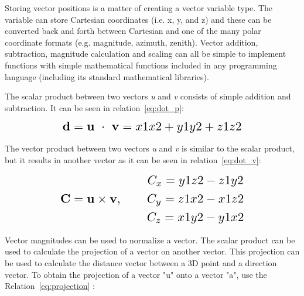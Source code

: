 Storing vector positions is a matter of creating a vector variable type.
The variable can store Cartesian coordinates (i.e. x, y, and z) and these
can be converted back and forth between Cartesian and
one of the many polar coordinate formats (e.g. magnitude, azimuth, zenith).
Vector addition, subtraction, magnitude calculation and scaling can all be simple
to implement functions with simple mathematical functions included in any
programming language (including its standard mathematical libraries).

The scalar product between two vectors \emph{u} and \emph{v} consists of simple
addition and subtraction. It can be seen in relation~\ref{eq:dot_p}:

\begin{equation}
  \label{eq:dot_p}
  \addequationtoentry{The scalar product between two vectors} %
  \scalebox{1.5}{$ \mathbf{ d = u~\cdot~v } = x1x2 + y1y2 + z1z2 $}
\end{equation}

The vector product between two vectors \emph{u} and \emph{v} is similar to the
scalar product, but it results in another vector as it can be seen in
relation~\ref{eq:dot_v}:

\begin{equation}
  \label{eq:dot_v}
  \addequationtoentry{The vector product between two vectors} %
  \scalebox{1.5}{$
    \mathbf{ C = u \times v }, \qquad
    \begin{gathered}
      C_x = y1z2 - z1y2 \\
      C_y = z1x2 - x1z2 \\
      C_z = x1y2 - y1x2
    \end{gathered}
   $}
\end{equation}



Vector magnitudes can be used to normalize a vector. 
The scalar product can be
used to calculate the projection of a vector on another vector. This projection can be used
to calculate the distance vector between a 3D point and a direction vector. To obtain the
projection of a vector "u" onto a vector "a", use the Relation~\ref{eq:projection}
\cite{algebra}:

